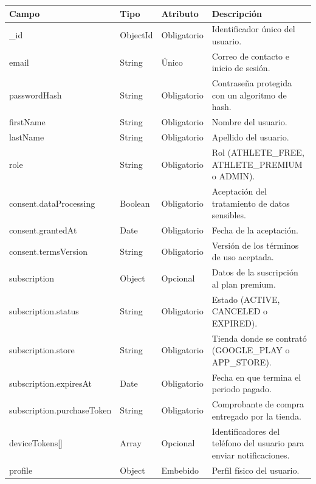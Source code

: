 {\footnotesize
\renewcommand{\arraystretch}{1.2}
\begin{longtable}{|>{\raggedright\arraybackslash}p{4.7cm}|>{\raggedright\arraybackslash}p{1.8cm}|>{\raggedright\arraybackslash}p{2.3cm}|>{\raggedright\arraybackslash}p{5.4cm}|}
    \hline
    \rowcolor[HTML]{EFEFEF}
    \textbf{Campo} & \textbf{Tipo} & \textbf{Atributo} & \textbf{Descripción} \\ \hline
    \endhead
    \_id & ObjectId & Obligatorio & Identificador único del usuario. \\ \hline
    email & String & Único & Correo de contacto e inicio de sesión. \\ \hline
    passwordHash & String & Obligatorio & Contraseña protegida con un algoritmo de hash. \\ \hline
    firstName & String & Obligatorio & Nombre del usuario. \\ \hline
    lastName & String & Obligatorio & Apellido del usuario. \\ \hline
    role & String & Obligatorio & Rol (ATHLETE\_FREE, ATHLETE\_PREMIUM o ADMIN). \\ \hline
    consent.\allowbreak dataProcessing & Boolean & Obligatorio & Aceptación del tratamiento de datos sensibles. \\ \hline
    consent.\allowbreak grantedAt & Date & Obligatorio & Fecha de la aceptación. \\ \hline
    consent.\allowbreak termsVersion & String & Obligatorio & Versión de los términos de uso aceptada. \\ \hline
    subscription & Object & Opcional & Datos de la suscripción al plan premium. \\ \hline
    subscription.\allowbreak status & String & Obligatorio & Estado (ACTIVE, CANCELED o EXPIRED). \\ \hline
    subscription.\allowbreak store & String & Obligatorio & Tienda donde se contrató (GOOGLE\_PLAY o APP\_STORE). \\ \hline
    subscription.\allowbreak expiresAt & Date & Obligatorio & Fecha en que termina el periodo pagado. \\ \hline
    subscription.\allowbreak purchaseToken & String & Obligatorio & Comprobante de compra entregado por la tienda. \\ \hline
    deviceTokens[] & Array & Opcional & Identificadores del teléfono del usuario para enviar notificaciones. \\ \hline
    profile & Object & Embebido & Perfil físico del usuario. \\ \hline

\end{longtable}}
